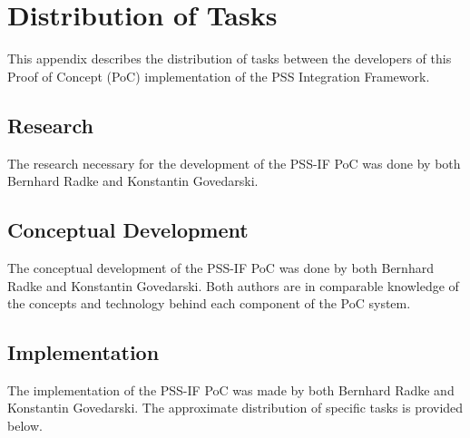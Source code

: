 \chapter{Distribution of Tasks}
\label{app:distribution}

This appendix describes the distribution of tasks between the developers of this Proof of Concept (PoC) implementation of the PSS Integration Framework.

\section*{Research}

The research necessary for the development of the PSS-IF PoC was done by both Bernhard Radke and Konstantin Govedarski.

\section*{Conceptual Development}

The conceptual development of the PSS-IF PoC was done by both Bernhard Radke and Konstantin Govedarski. Both authors are in comparable knowledge of the concepts and technology behind each component of the PoC system.

\section*{Implementation}

The implementation of the PSS-IF PoC was made by both Bernhard Radke and Konstantin Govedarski. The approximate distribution of specific tasks is provided below.

